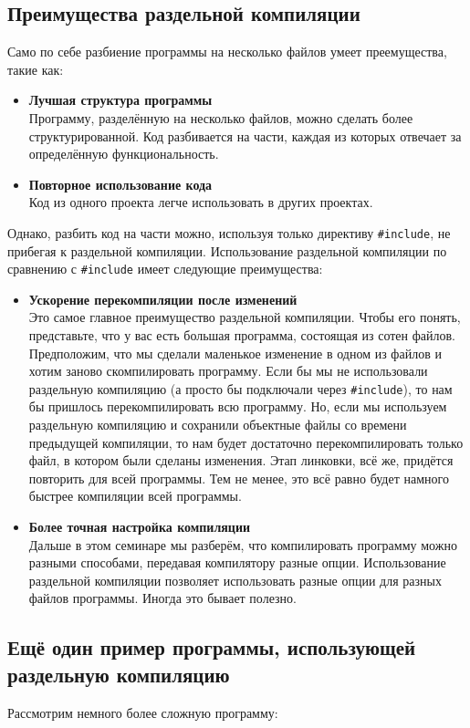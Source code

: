 \documentclass{article}
\begin{document}
\subsection*{Преимущества раздельной компиляции}
Само по себе разбиение программы на несколько файлов умеет преемущества, такие как:
\begin{itemize}
\item \textbf{Лучшая структура программы}\\
Программу, разделённую на несколько файлов, можно сделать более структурированной. Код разбивается на части, каждая из которых отвечает за определённую функциональность.
\item \textbf{Повторное использование кода}\\
Код из одного проекта легче использовать в других проектах.
\end{itemize}
Однако, разбить код на части можно, используя только директиву \texttt{\#include}, не прибегая к раздельной компиляции. Использование раздельной компиляции по сравнению с \texttt{\#include} имеет следующие преимущества:

\begin{itemize}
\item \textbf{Ускорение перекомпиляции после изменений}\\
Это самое главное преимущество раздельной компиляции. Чтобы его понять, представьте, что у вас есть большая программа, состоящая из сотен файлов. Предположим, что
мы сделали маленькое изменение в одном из файлов и хотим заново скомпилировать программу. Если бы мы не использовали раздельную компиляцию (а просто бы подключали через \texttt{\#include}), то нам бы пришлось перекомпилировать всю программу. Но, если мы используем раздельную компиляцию и сохранили объектные файлы со времени предыдущей компиляции, то нам будет достаточно перекомпилировать только файл, в котором были сделаны изменения. Этап линковки, всё же, придётся повторить для всей программы. Тем не менее, это всё равно будет намного быстрее компиляции всей программы.

\item \textbf{Более точная настройка компиляции}\\
Дальше в этом семинаре мы разберём, что компилировать программу можно разными способами, передавая компилятору разные опции. Использование раздельной компиляции позволяет использовать разные опции для разных файлов программы. Иногда это бывает полезно.
\end{itemize}


\subsection*{Ещё один пример программы, использующей раздельную компиляцию}
Рассмотрим немного более сложную программу:
\end{document}
